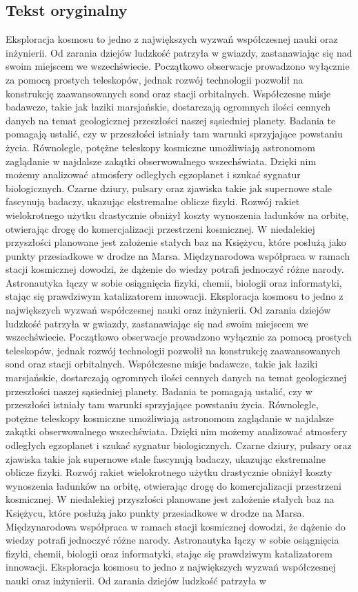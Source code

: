 \documentclass[12pt,a4paper]{article}
\begin{document}
\subsection{Tekst oryginalny}
Eksploracja kosmosu to jedno z największych wyzwań współczesnej nauki oraz inżynierii. Od zarania dziejów ludzkość patrzyła w gwiazdy, zastanawiając się nad swoim miejscem we wszechświecie. Początkowo obserwacje prowadzono wyłącznie za pomocą prostych teleskopów, jednak rozwój technologii pozwolił na konstrukcję zaawansowanych sond oraz stacji orbitalnych. Współczesne misje badawcze, takie jak łaziki marsjańskie, dostarczają ogromnych ilości cennych danych na temat geologicznej przeszłości naszej sąsiedniej planety. Badania te pomagają ustalić, czy w przeszłości istniały tam warunki sprzyjające powstaniu życia. Równolegle, potężne teleskopy kosmiczne umożliwiają astronomom zaglądanie w najdalsze zakątki obserwowalnego wszechświata. Dzięki nim możemy analizować atmosfery odległych egzoplanet i szukać sygnatur biologicznych. Czarne dziury, pulsary oraz zjawiska takie jak supernowe stale fascynują badaczy, ukazując ekstremalne oblicze fizyki. Rozwój rakiet wielokrotnego użytku drastycznie obniżył koszty wynoszenia ładunków na orbitę, otwierając drogę do komercjalizacji przestrzeni kosmicznej. W niedalekiej przyszłości planowane jest założenie stałych baz na Księżycu, które posłużą jako punkty przesiadkowe w drodze na Marsa. Międzynarodowa współpraca w ramach stacji kosmicznej dowodzi, że dążenie do wiedzy potrafi jednoczyć różne narody. Astronautyka łączy w sobie osiągnięcia fizyki, chemii, biologii oraz informatyki, stając się prawdziwym katalizatorem innowacji. Eksploracja kosmosu to jedno z największych wyzwań współczesnej nauki oraz inżynierii. Od zarania dziejów ludzkość patrzyła w gwiazdy, zastanawiając się nad swoim miejscem we wszechświecie. Początkowo obserwacje prowadzono wyłącznie za pomocą prostych teleskopów, jednak rozwój technologii pozwolił na konstrukcję zaawansowanych sond oraz stacji orbitalnych. Współczesne misje badawcze, takie jak łaziki marsjańskie, dostarczają ogromnych ilości cennych danych na temat geologicznej przeszłości naszej sąsiedniej planety. Badania te pomagają ustalić, czy w przeszłości istniały tam warunki sprzyjające powstaniu życia. Równolegle, potężne teleskopy kosmiczne umożliwiają astronomom zaglądanie w najdalsze zakątki obserwowalnego wszechświata. Dzięki nim możemy analizować atmosfery odległych egzoplanet i szukać sygnatur biologicznych. Czarne dziury, pulsary oraz zjawiska takie jak supernowe stale fascynują badaczy, ukazując ekstremalne oblicze fizyki. Rozwój rakiet wielokrotnego użytku drastycznie obniżył koszty wynoszenia ładunków na orbitę, otwierając drogę do komercjalizacji przestrzeni kosmicznej. W niedalekiej przyszłości planowane jest założenie stałych baz na Księżycu, które posłużą jako punkty przesiadkowe w drodze na Marsa. Międzynarodowa współpraca w ramach stacji kosmicznej dowodzi, że dążenie do wiedzy potrafi jednoczyć różne narody. Astronautyka łączy w sobie osiągnięcia fizyki, chemii, biologii oraz informatyki, stając się prawdziwym katalizatorem innowacji. Eksploracja kosmosu to jedno z największych wyzwań współczesnej nauki oraz inżynierii. Od zarania dziejów ludzkość patrzyła w 
\end{document}
